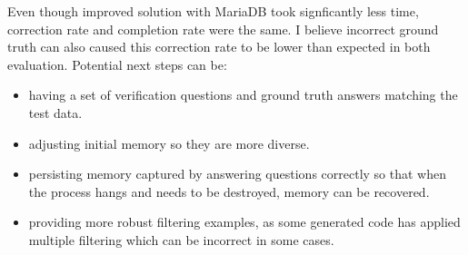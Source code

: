 \documentclass[screen,review]{acmart}
\begin{document}
Even though improved solution with MariaDB took signficantly less time, correction rate and completion rate were the same. 
I believe incorrect ground truth can also caused this correction rate to be lower than expected in both evaluation. 
Potential next steps can be:  
\begin{itemize}
  \item having a set of verification questions and ground truth answers matching the test data.
  \item adjusting initial memory so they are more diverse.
  \item persisting memory captured by answering questions correctly so that when the process hangs and needs to be destroyed, memory can be recovered.
  \item providing more robust filtering examples, as some generated code has applied multiple filtering which can be incorrect in some cases.
\end{itemize}



\end{document}
